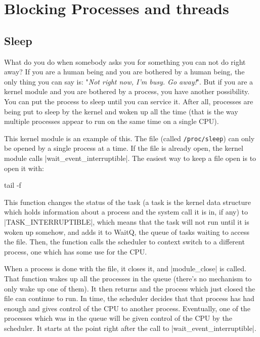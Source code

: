 \documentclass[10pt, oneside]{book}
\begin{document}

\section{Blocking Processes and threads}
\label{sec:blocking_process_thread}
\subsection{Sleep}
\label{sec:sleep}
What do you do when somebody asks you for something you can not do right away?
If you are a human being and you are bothered by a human being, the only thing you can say is: "\emph{Not right now, I'm busy. Go away!}".
But if you are a kernel module and you are bothered by a process, you have another possibility.
You can put the process to sleep until you can service it.
After all, processes are being put to sleep by the kernel and woken up all the time (that is the way multiple processes appear to run on the same time on a single CPU).

This kernel module is an example of this.
The file (called \verb|/proc/sleep|) can only be opened by a single process at a time.
If the file is already open, the kernel module calls \cpp|wait_event_interruptible|.
The easiest way to keep a file open is to open it with:

\begin{codebash}
tail -f
\end{codebash}

This function changes the status of the task (a task is the kernel data structure which holds information about a process and the system call it is in,
if any) to \cpp|TASK_INTERRUPTIBLE|, which means that the task will not run until it is woken up somehow, and adds it to WaitQ, the queue of tasks waiting to access the file.
Then, the function calls the scheduler to context switch to a different process, one which has some use for the CPU.

When a process is done with the file, it closes it, and \cpp|module_close| is called.
That function wakes up all the processes in the queue (there's no mechanism to only wake up one of them).
It then returns and the process which just closed the file can continue to run.
In time, the scheduler decides that that process has had enough and gives control of the CPU to another process.
Eventually, one of the processes which was in the queue will be given control of the CPU by the scheduler.
It starts at the point right after the call to \cpp|wait_event_interruptible|.
\end{document}

